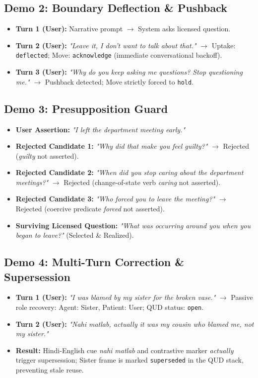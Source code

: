 \documentclass[11pt,a4paper]{article}
\begin{document}
\subsection{Demo 2: Boundary Deflection \& Pushback}
\begin{itemize}
    \item \textbf{Turn 1 (User):} Narrative prompt $\rightarrow$ System asks licensed question.
    \item \textbf{Turn 2 (User):} \emph{"Leave it, I don't want to talk about that."} $\rightarrow$ Uptake: \texttt{deflected}; Move: \texttt{acknowledge} (immediate conversational backoff).
    \item \textbf{Turn 3 (User):} \emph{"Why do you keep asking me questions? Stop questioning me."} $\rightarrow$ Pushback detected; Move strictly forced to \texttt{hold}.
\end{itemize}

\subsection{Demo 3: Presupposition Guard}
\begin{itemize}
    \item \textbf{User Assertion:} \emph{"I left the department meeting early."}
    \item \textbf{Rejected Candidate 1:} \emph{"Why did that make you feel guilty?"} $\rightarrow$ Rejected (\emph{guilty} not asserted).
    \item \textbf{Rejected Candidate 2:} \emph{"When did you stop caring about the department meetings?"} $\rightarrow$ Rejected (change-of-state verb \emph{caring} not asserted).
    \item \textbf{Rejected Candidate 3:} \emph{"Who forced you to leave the meeting?"} $\rightarrow$ Rejected (coercive predicate \emph{forced} not asserted).
    \item \textbf{Surviving Licensed Question:} \emph{"What was occurring around you when you began to leave?"} (Selected \& Realized).
\end{itemize}

\subsection{Demo 4: Multi-Turn Correction \& Supersession}
\begin{itemize}
    \item \textbf{Turn 1 (User):} \emph{"I was blamed by my sister for the broken vase."} $\rightarrow$ Passive role recovery: Agent: Sister, Patient: User; QUD status: \texttt{open}.
    \item \textbf{Turn 2 (User):} \emph{"Nahi matlab, actually it was my cousin who blamed me, not my sister."}
    \item \textbf{Result:} Hindi-English cue \emph{nahi matlab} and contrastive marker \emph{actually} trigger supersession; Sister frame is marked \texttt{superseded} in the QUD stack, preventing stale reuse.
\end{itemize}
\end{document}
